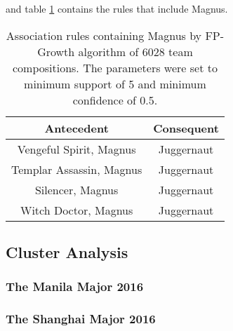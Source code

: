 \documentclass[result.tex]{subfiles}
\begin{document}
and table \ref{tab:ass_magnus} contains the rules that include Magnus.

\begin{table}[H]
  \centering
  \begin{tabular}{ | c | c | }
    \hline
    Antecedent & Consequent \\ \hline
    Vengeful Spirit, Magnus & Juggernaut \\ \hline
    Templar Assassin, Magnus & Juggernaut \\ \hline
    Silencer, Magnus & Juggernaut \\ \hline
    Witch Doctor, Magnus & Juggernaut  \\
    \hline
  \end{tabular}
  \caption{Association rules containing Magnus by FP-Growth algorithm of 6028 team compositions. The parameters were set to minimum support of 5 and minimum confidence of 0.5.}
  \label{tab:ass_magnus}
\end{table}

\subsection*{Cluster Analysis}

\subsubsection*{The Manila Major 2016}

\subsubsection*{The Shanghai Major 2016}
\end{document}
